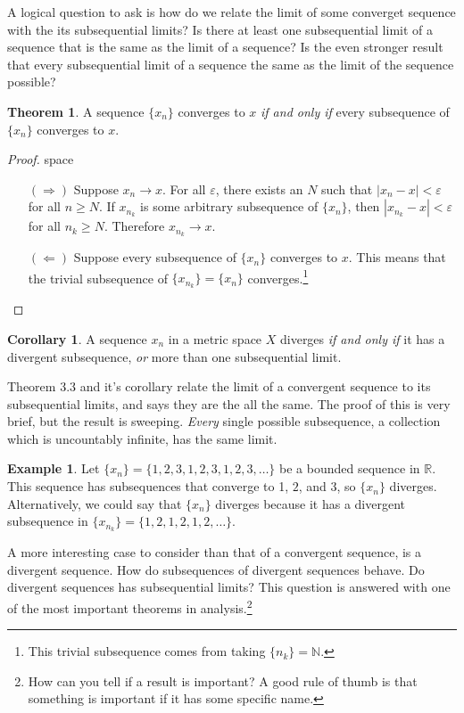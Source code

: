 \documentclass{article}
\newcommand{\N}{\mathbb{N}}
\newcommand{\R}{\mathbb{R}}
\theoremstyle{definition}
\newtheorem{theorem}{Theorem}[section]
\newtheorem{corollary}{Corollary}[section]
\newtheorem{example}{Example}[section]
\begin{document}
	A logical question to ask is how do we relate the limit of some converget sequence with the its subsequential limits? Is there at least one subsequential limit of a sequence that is the same as the limit of a sequence? Is the even stronger result that every subsequential limit of a sequence the same as the limit of the sequence possible? 
	\begin{theorem}
		A sequence $ \{x_n\} $ converges to $ x $ \textit{if and only if} every subsequence of $ \{x_n\} $ converges to $ x $.
	\end{theorem} 
	\begin{proof}{\color{white}space}
		\begin{enumerate}
			\item [$ (\Longrightarrow) $] Suppose $ x_n\to x $. For all $ \varepsilon $, there exists an $N $ such that $ |x_n-x|<\varepsilon $ for all $ n\ge N $. If $ x_{n_k} $ is some arbitrary subsequence of $ \{x_n\} $, then $ |x_{n_k}-x|<\varepsilon $ for all $ n_k\ge N $. Therefore $ x_{n_k}\to x $. 
			\item [$ (\Longleftarrow) $]  Suppose every subsequence of $ \{x_n\} $ converges to $ x $. This means that the trivial subsequence of $ \{x_{n_k}\}=\{x_n\} $ converges.\footnote{This trivial subsequence comes from taking $ \{n_k\}=\N $.} 
		\end{enumerate}
	\end{proof}
	\begin{corollary}
		A sequence $ x_n $ in a metric space $ X $ diverges \textit{if and only if} it has a divergent subsequence, \textit{or} more than one subsequential limit. 
	\end{corollary}
	Theorem 3.3 and it's corollary relate the limit of a convergent sequence to its subsequential limits, and says they are the all the same. The proof of this is very brief, but the result is sweeping. \textit{Every} single possible subsequence, a collection which is uncountably infinite, has the same limit.    
	\begin{example}
		Let $ \{x_n\}=\{1,2,3,1,2,3,1,2,3,\ldots\} $ be a bounded sequence in $ \R $. This sequence has subsequences that converge to 1, $2 $, and 3, so $ \{x_n\} $ diverges. Alternatively, we could say that $ \{x_n\} $ diverges because it has a divergent subsequence in $ \{x_{n_k}\}=\{1,2,1,2,1,2,\ldots\} $.  
	\end{example}
	A more interesting case to consider than that of a convergent sequence, is a divergent sequence. How do subsequences of divergent sequences behave. Do divergent sequences has subsequential limits? This question is answered with one of the most important theorems in analysis.\footnote{How can you tell if a result is important? A good rule of thumb is that something is important if it has some specific name.}
\end{document}
